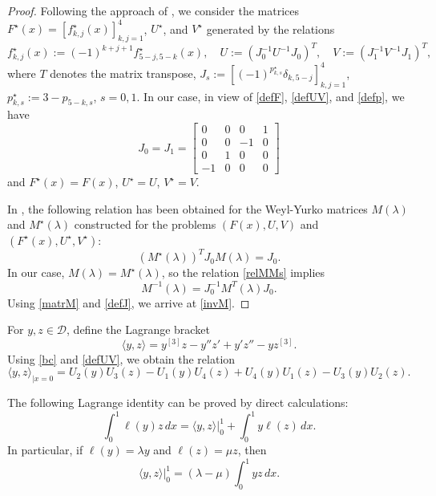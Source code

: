 \documentclass[a4paper,12pt]{article}
\newcommand{\la}{\lambda}
\theoremstyle{plain}
\numberwithin{equation}{section}
\theoremstyle{definition}
\theoremstyle{remark}
\begin{document}
\begin{proof}
Following the approach of \cite[Section 2]{Bond22-alg}, we consider the matrices $F^{\star}(x) = [f_{k,j}^{\star}(x)]_{k,j = 1}^4$, $U^{\star}$, and $V^{\star}$ generated by the relations
$$
f_{k,j}^{\star}(x) := (-1)^{k + j + 1} f_{5 - j, 5 - k}^{\star}(x), \quad
U := (J_0^{-1} U^{-1} J_0)^T, \quad V := (J_1^{-1} V^{-1} J_1)^T,
$$
where $T$ denotes the matrix transpose, $J_s := [(-1)^{p_{k,s}^{\star}} \delta_{k,5-j}]_{k,j = 1}^4$, $p_{k,s}^{\star} := 3 - p_{5 - k,s}$, $s = 0, 1$. In our case, in view of \eqref{defF}, \eqref{defUV}, and \eqref{defp},
we have
\begin{equation} \label{defJ}
J_0 = J_1 = \begin{bmatrix}
                0 & 0 & 0 & 1 \\
                0 & 0 & -1 & 0 \\
                0 & 1 & 0 & 0 \\
                -1 & 0 & 0 & 0
            \end{bmatrix}
\end{equation}
and $F^{\star}(x) = F(x)$, $U^{\star} = U$, $V^{\star} = V$.

In \cite{Bond22-alg}, the following relation has been obtained for the Weyl-Yurko matrices $M(\la)$ and $M^{\star}(\la)$ constructed for the problems $(F(x), U, V)$ and $(F^{\star}(x), U^{\star}, V^{\star})$:
\begin{equation} \label{relMMs}
(M^{\star}(\la))^T J_0 M(\la) = J_0. 
\end{equation}
In our case, $M(\la) = M^{\star}(\la)$, so the relation \eqref{relMMs} implies
$$
M^{-1}(\la) = J_0^{-1} M^T(\la) J_0.
$$
Using \eqref{matrM} and \eqref{defJ}, we arrive at \eqref{invM}.
\end{proof}

For $y, z \in \mathcal D$, define the Lagrange bracket
$$
\langle y, z \rangle = y^{[3]} z - y''z' + y'z'' - y z^{[3]}.
$$
Using \eqref{bc} and \eqref{defUV}, we obtain the relation
\begin{equation} \label{brack0}
\langle y, z \rangle_{|x = 0} = U_2(y) U_3(z) - U_1(y) U_4(z) + U_4(y) U_1(z) - U_3(y) U_2(z).
\end{equation}

The following Lagrange identity can be proved by direct calculations:
$$
\int_0^1 \ell(y) z \, dx = \langle y, z \rangle\big|_0^1 + \int_0^1 y \ell(z) \, dx.
$$
In particular, if $\ell(y) = \la y$ and $\ell(z) = \mu z$, then
\begin{equation} \label{wron}
\langle y, z \rangle\big|_0^1 = (\la - \mu) \int_0^1 y z \, dx.
\end{equation}
\end{document}
